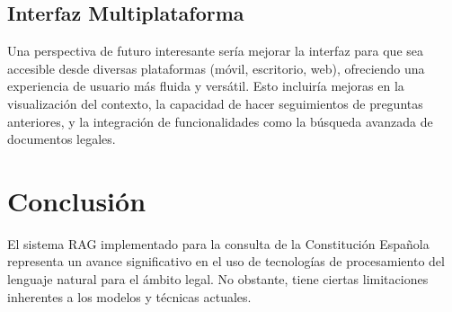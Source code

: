 \subsection{Interfaz Multiplataforma}
Una perspectiva de futuro interesante sería mejorar la interfaz para que sea accesible desde diversas plataformas (móvil, escritorio, web), ofreciendo una experiencia de usuario más fluida y versátil. Esto incluiría mejoras en la visualización del contexto, la capacidad de hacer seguimientos de preguntas anteriores, y la integración de funcionalidades como la búsqueda avanzada de documentos legales.

\section{Conclusión}
El sistema RAG implementado para la consulta de la Constitución Española representa un avance significativo en el uso de tecnologías de procesamiento del lenguaje natural para el ámbito legal. No obstante, tiene ciertas limitaciones inherentes a los modelos y técnicas actuales.